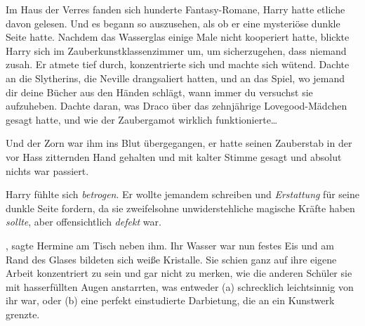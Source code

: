 Im Haus der Verres fanden sich hunderte Fantasy-Romane, Harry hatte etliche davon gelesen. Und es begann so auszusehen, als ob er eine mysteriöse dunkle Seite hatte. Nachdem das Wasserglas einige Male nicht kooperiert hatte, blickte Harry sich im Zauberkunstklassenzimmer um, um sicherzugehen, dass niemand zusah. Er atmete tief durch, konzentrierte sich und machte sich wütend. Dachte an die Slytherins, die Neville drangsaliert hatten, und an das Spiel, wo jemand dir deine Bücher aus den Händen schlägt, wann immer du versuchst sie aufzuheben. Dachte daran, was Draco über das zehnjährige Lovegood-Mädchen gesagt hatte, und wie der Zaubergamot wirklich funktionierte…

Und der Zorn war ihm ins Blut übergegangen, er hatte seinen Zauberstab in der vor Hass zitternden Hand gehalten und mit kalter Stimme  gesagt und absolut nichts war passiert.

Harry fühlte sich \emph{betrogen}. Er wollte jemandem schreiben und \emph{Erstattung} für seine dunkle Seite fordern, da sie zweifelsohne unwiderstehliche magische Kräfte haben \emph{sollte}, aber offensichtlich \emph{defekt} war.

, sagte Hermine am Tisch neben ihm. Ihr Wasser war nun festes Eis und am Rand des Glases bildeten sich weiße Kristalle. Sie schien ganz auf ihre eigene Arbeit konzentriert zu sein und gar nicht zu merken, wie die anderen Schüler sie mit hasserfüllten Augen anstarrten, was entweder (a) schrecklich leichtsinnig von ihr war, oder (b) eine perfekt einstudierte Darbietung, die an ein Kunstwerk grenzte.


